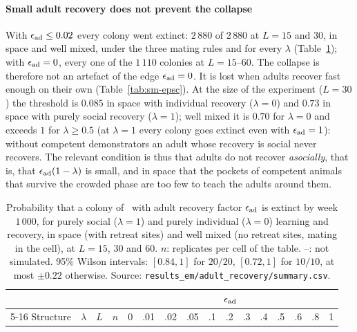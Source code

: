 \paragraph{Small adult recovery does not prevent the collapse}
With $\epsilon_{\rm ad}\le0.02$ every colony went extinct: $2\,880$ of $2\,880$ at $L=15$ and $30$, in space and well mixed,
under the three mating rules and for every $\lambda$ (Table~\ref{tab:sm-pext}); with $\epsilon_{\rm ad}=0$, every one of the
$1\,110$ colonies at $L=15$--$60$. The collapse is therefore not an artefact of the edge $\epsilon_{\rm ad}=0$. It is lost
when adults recover fast enough on their own (Table~\ref{tab:sm-epsc}). At the size of the experiment ($L=30$)
the threshold is $0.085$ in space with individual recovery ($\lambda=0$) and $0.73$ in space with purely social
recovery ($\lambda=1$); well mixed it is $0.70$ for $\lambda=0$ and exceeds $1$ for $\lambda\ge0.5$ (at $\lambda=1$
every colony goes extinct even with $\epsilon_{\rm ad}=1$): without competent demonstrators an adult whose recovery is social
never recovers. The relevant condition is thus that
adults do not recover \emph{asocially}, that is, that $\epsilon_{\rm ad}(1-\lambda)$ is small, and in space that the pockets of
competent animals that survive the crowded phase are too few to teach the adults around them.

\begin{table}[ht]
\centering
\caption{Probability that a colony of \Cone\ with adult recovery factor $\epsilon_{\rm ad}$ is extinct by week $1\,000$, for
purely social ($\lambda=1$) and purely individual ($\lambda=0$) learning and recovery, in space (with retreat sites)
and well mixed (no retreat sites, mating in the cell), at $L=15$, $30$ and $60$. $n$: replicates per cell of the
table. --: not simulated. 95\% Wilson intervals: $[0.84,1]$ for $20/20$, $[0.72,1]$ for $10/10$, at most $\pm0.22$
otherwise. Source: \texttt{results\_em/adult\_recovery/summary.csv}.}
\label{tab:sm-pext}
\scriptsize
\setlength{\tabcolsep}{2.6pt}
\begin{tabular}{@{}lcrr*{12}{c}@{}}
\toprule
& & & & \multicolumn{12}{c}{$\epsilon_{\rm ad}$} \\
\cmidrule(l){5-16}
Structure & $\lambda$ & $L$ & $n$ & 0 & .01 & .02 & .05 & .1 & .2 & .3 & .4 & .5 & .6 & .8 & 1 \\
\midrule

\end{tabular}
\end{table}

